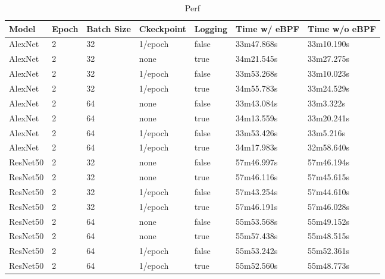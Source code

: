 \documentclass[conference]{IEEEtran}
\begin{document}
\begin{table}
    \caption{Perf}\label{tab:perf}
    \begin{center}
        \begin{tabular}[c]{|l|l|l|l|l|l|l|}
            \hline
            \rowcolor{gray}
            Model & Epoch & Batch Size & Ckeckpoint & Logging & Time w/ eBPF & Time w/o eBPF \\
            \hline
            AlexNet & 2 & 32 & 1/epoch & false &    33m47.868s & 33m10.190s \\
            \hline
            AlexNet & 2 & 32 & none & true &    34m21.545s & 33m27.275s \\
            \hline
            AlexNet & 2 & 32 & 1/epoch & false &    33m53.268s & 33m10.023s \\
            \hline
            AlexNet & 2 & 32 & 1/epoch & true &    34m55.783s & 33m24.529s \\
            \hline
            AlexNet & 2 & 64 & none & false &    33m43.084s & 33m3.322s \\
            \hline
            AlexNet & 2 & 64 & none & true &    34m13.559s & 33m20.241s \\
            \hline
            AlexNet & 2 & 64 & 1/epoch & false &    33m53.426s & 33m5.216s \\
            \hline
            AlexNet & 2 & 64 & 1/epoch & true &    34m17.983s & 32m58.640s \\
            \hline
            ResNet50 & 2 & 32 & none & false &    57m46.997s & 57m46.194s \\
            \hline
            ResNet50 & 2 & 32 & none & true &     57m46.116s & 57m45.615s \\
            \hline
            ResNet50 & 2 & 32 & 1/epoch & false &    57m43.254s & 57m44.610s \\
            \hline
            ResNet50 & 2 & 32 & 1/epoch & true &     57m46.191s & 57m46.028s \\
            \hline
            ResNet50 & 2 & 64 & none & false &    55m53.568s & 55m49.152s \\
            \hline
            ResNet50 & 2 & 64 & none & true &     55m57.438s & 55m48.515s \\
            \hline
            ResNet50 & 2 & 64 & 1/epoch & false &    55m53.242s & 55m52.361s \\
            \hline
            ResNet50 & 2 & 64 & 1/epoch & true &     55m52.560s & 55m48.773s \\
            \hline
        \end{tabular}
    \end{center}
\end{table}
\end{document}
